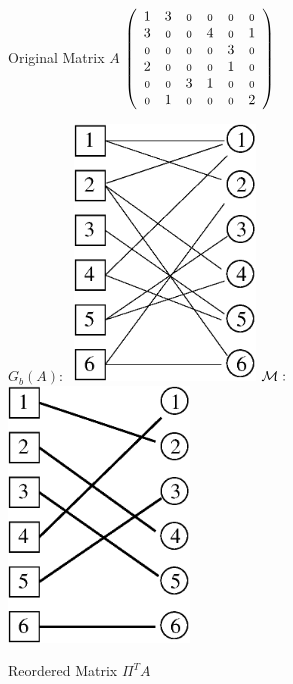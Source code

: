 \begin{figure}
 \centering
\begin{minipage}{.33\textwidth}
 \begin{center}
 Original Matrix $A$
    $\left(
%
        \begin{array}{cccccc}
         1 & 3 & \nl & \nl & \nl & \nl \\
          3  & \nl & \nl & 4 & \nl & 1 \\
        \nl & \nl & \nl & \nl &  3  & \nl \\
        2 &  \nl  & \nl & \nl & 1 & \nl \\
        \nl & \nl &  3  & 1 & \nl & \nl \\
        \nl & 1 & \nl & \nl & \nl &  2
        \end{array}
    \right) $ 
 \end{center}
\end{minipage}
\begin{minipage}{.32\textwidth}
 \begin{center}
$G_b(A): \;$ 
\includegraphics[width=0.43\textwidth]{figures/matching1} 
%
%
\hspace{0.5cm}$\mathcal{M}: \;$ 
\includegraphics[width=0.43\textwidth]{figures/matching2} 
 \end{center}
\end{minipage}
\begin{minipage}{.32\textwidth}
  \begin{center}
Reordered Matrix $\Pi^TA$


\end{center}
\end{minipage}
\end{figure}
